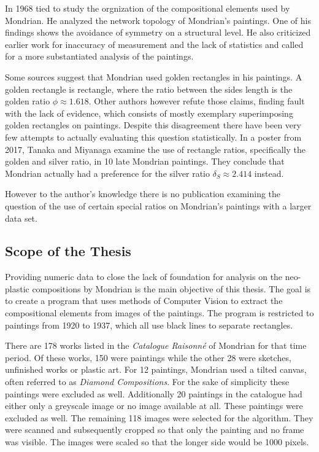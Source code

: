\documentclass[serif,article,noparskip]{agse-thesis}
\begin{document}
In 1968 \cite{Hill1948} tied to study the orgnization of the compositional
elements used by Mondrian. He analyzed the network topology of Mondrian's
paintings. One of his findings shows the avoidance of symmetry on a structural
level. He also criticized earlier work for inaccuracy of measurement and the
lack of statistics and called for a more substantiated analysis of the
paintings.

Some sources \cite{bouleau1963,bergamini1980} suggest that Mondrian used golden
rectangles in his paintings. A golden rectangle is rectangle, where the ratio
between the sides length is the golden ratio $\phi \approx 1.618$. Other authors
however \cite{Livio2002,Markowsky1992} refute those claims, finding fault with
the lack of evidence, which consists of mostly exemplary superimposing golden
rectangles on paintings. Despite this disagreement there have been very few
attempts to actually evaluating this question statistically. In a poster from
2017, Tanaka and Miyanaga \cite{Tanaka2017} examine the use of rectangle ratios,
specifically the golden and silver ratio, in 10 late Mondrian paintings. They
conclude that Mondrian actually had a preference for the silver ratio $\delta_S
\approx 2.414$ instead.

However to the author's knowledge there is no publication examining the question of
the use of certain special ratios on Mondrian's paintings with a larger data
set.

\subsection{Scope of the Thesis}

Providing numeric data to close the lack of foundation for analysis on the
neo-plastic compositions by Mondrian is the main objective of this thesis. The
goal is to create a program that uses methods of Computer Vision to extract the
compositional elements from images of the paintings. The program is restricted
to paintings from 1920 to 1937, which all use black lines to separate rectangles.

There are 178 works listed in the \textit{Catalogue Raisonn{\'e}}
\cite{joosten1998} of Mondrian for that time period. Of these works, 150 were
paintings while the other 28 were sketches, unfinished works or plastic art. For
12 paintings, Mondrian used a tilted canvas, often referred to as
\textit{Diamond Compositions}. For the sake of simplicity these paintings were
excluded as well. Additionally 20 paintings in the catalogue had either only a
greyscale image or no image available at all. These paintings were excluded as
well. The remaining 118 images were selected for the algorithm. They were
scanned and subsequently cropped so that only the painting and no frame was
visible. The images were scaled so that the longer side would be 1000 pixels.
\end{document}

